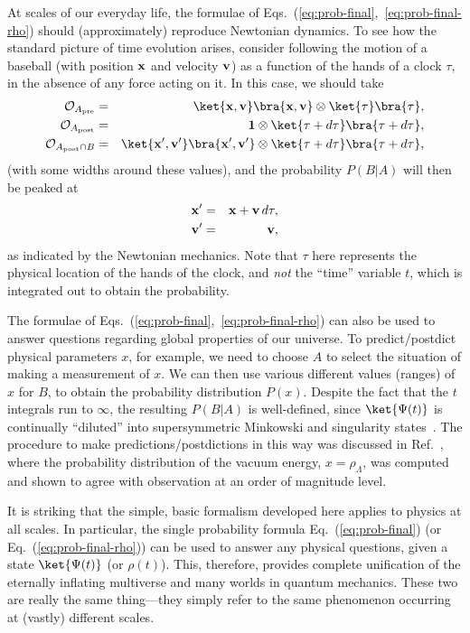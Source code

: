 \documentclass[12pt]{article}
\begin{document}
At scales of our everyday life, the formulae of 
Eqs.~(\ref{eq:prob-final},~\ref{eq:prob-final-rho}) should 
(approximately) reproduce Newtonian dynamics.  To see how the standard 
picture of time evolution arises, consider following the motion of a 
baseball (with position ${\bf x}$ and velocity ${\bf v}$) as a function 
of the hands of a clock $\tau$, in the absence of any force acting on it. 
In this case, we should take
%
\begin{eqnarray}
  {\cal O}_{A_{\rm pre}} &=& \ket{{\bf x},{\bf v}}\bra{{\bf x},{\bf v}} 
    \otimes \ket{\tau}\bra{\tau},
\label{eq:O_Apre-ball}\\
  {\cal O}_{A_{\rm post}} &=& {\bf 1} \otimes \ket{\tau+d\tau}\bra{\tau+d\tau},
\label{eq:O_Apost-ball}\\
  {\cal O}_{A_{\rm post} \cap B} &=& 
    \ket{{\bf x'},{\bf v'}}\bra{{\bf x'},{\bf v'}} 
    \otimes \ket{\tau+d\tau}\bra{\tau+d\tau},
\label{eq:O_B-ball}
\end{eqnarray}
%
(with some widths around these values), and the probability $P(B|A)$ 
will then be peaked at
%
\begin{eqnarray}
  {\bf x'} &=& {\bf x} + {\bf v}\,d\tau,
\label{eq:Newton-1}\\
  {\bf v'} &=& {\bf v},
\label{eq:Newton-2}
\end{eqnarray}
%
as indicated by the Newtonian mechanics.  Note that $\tau$ here represents 
the physical location of the hands of the clock, and {\it not} the ``time'' 
variable $t$, which is integrated out to obtain the probability.

The formulae of Eqs.~(\ref{eq:prob-final},~\ref{eq:prob-final-rho}) 
can also be used to answer questions regarding global properties of 
our universe.  To predict/postdict physical parameters $x$, for example, 
we need to choose $A$ to select the situation of making a measurement 
of $x$.  We can then use various different values (ranges) of $x$ for 
$B$, to obtain the probability distribution $P(x)$.  Despite the fact 
that the $t$ integrals run to $\infty$, the resulting $P(B|A)$ is 
well-defined, since $\ket{\Psi(t)}$ is continually ``diluted'' into 
supersymmetric Minkowski and singularity states~\cite{Nomura:2011dt}. 
The procedure to make predictions/postdictions in this way was discussed 
in Ref.~\cite{Larsen:2011mi}, where the probability distribution of 
the vacuum energy, $x = \rho_\Lambda$, was computed and shown to 
agree with observation at an order of magnitude level.

It is striking that the simple, basic formalism developed here applies 
to physics at all scales.  In particular, the single probability 
formula Eq.~(\ref{eq:prob-final}) (or Eq.~(\ref{eq:prob-final-rho})) can 
be used to answer any physical questions, given a state $\ket{\Psi(t)}$ 
(or $\rho(t)$).  This, therefore, provides complete unification of 
the eternally inflating multiverse and many worlds in quantum mechanics. 
These two are really the same thing---they simply refer to the same 
phenomenon occurring at (vastly) different scales.
\end{document}

